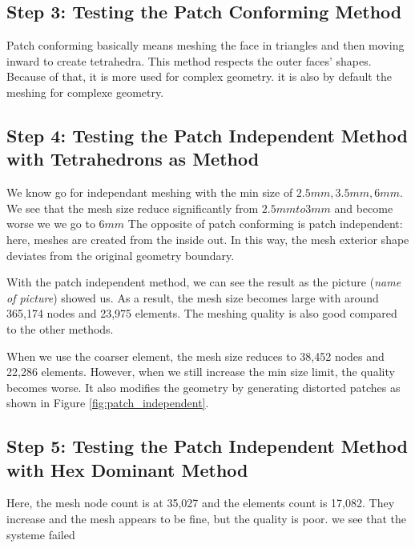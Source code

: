 \documentclass[12pt, a4paper]{article}
\begin{document}
	\subsection{Step 3: Testing the Patch Conforming Method}
	Patch conforming basically means meshing the face in triangles and then moving inward to create tetrahedra. This method respects the outer faces' shapes. Because of that, it is more used for complex geometry. it is also by default the meshing for complexe geometry.
	
	
	\subsection{Step 4: Testing the Patch Independent Method with Tetrahedrons as Method}
	We know go for independant meshing with the min size of $ 2.5mm, 3.5 mm, 6 mm $. We see that the mesh size reduce significantly from $ 2.5mm to 3 mm $ and become worse we we go to $ 6 mm$
	The opposite of patch conforming is patch independent: here, meshes are created from the inside out. In this way, the mesh exterior shape deviates from the original geometry boundary.
	
	With the patch independent method, we can see the result as the picture (\textit{name of picture}) showed us. As a result, the mesh size becomes large with around 365,174 nodes and 23,975 elements. The meshing quality is also good compared to the other methods.
	
	When we use the coarser element, the mesh size reduces to 38,452 nodes and 22,286 elements. However, when we still increase the min size limit, the quality becomes worse. It also modifies the geometry by generating distorted patches as shown in Figure \ref{fig:patch_independent}.
	

	
	
	\subsection{Step 5:  Testing the Patch Independent Method with Hex Dominant Method}
	Here, the mesh node count is at 35,027 and the elements count is 17,082. They increase and the mesh appears to be fine, but the quality is poor. we see that the systeme failed
	
\end{document}
